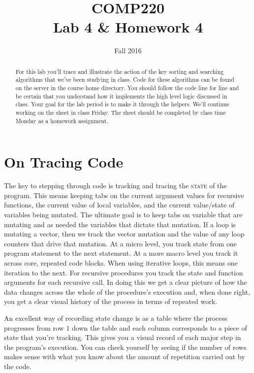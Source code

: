 \documentclass[10pt]{article}
\title{COMP220 \\ Lab 4 \& Homework 4}
\author{ }
\date{Fall 2016}
\begin{document}
\maketitle
\thispagestyle{empty}
\begin{abstract}
For this lab you'll trace and illustrate the action of the key sorting and searching algorithms that we've been studying in class. Code for these algorithms can be found on the server in the course home directory. You should follow the code line for line and be certain that you understand how it implements the high level logic discussed in class. Your goal for the lab period is to make it through the helpers. We'll continue working on the sheet in class Friday. The sheet should be completed by class time Monday as a homework assignment.
\end{abstract}

\section*{On Tracing Code}

The key to stepping through code is tracking and tracing the \textsc{state} of the program. This means keeping tabs on the current argument values for recursive functions, the current value of local variables, and the current value/state of variables being mutated. The ultimate goal is to keep tabs on variable that are mutating and as needed the variables that dictate that mutation. If a loop is mutating a vector, then we track the vector mutation and the value of any loop counters that drive that mutation. At a micro level, you track state from one program statement to the next statement. At a more macro level you track it across core, repeated code blocks.  When using iterative loops, this means one iteration to the next. For recursive procedures you track the state and function arguments for each recursive call. In doing this we get a clear picture of how the data changes across the whole of the procedure's execution and, when done right, you get a clear visual history of the process in terms of repeated work.

An excellent way of recording state change is as a table where the process progresses from row $1$ down the table and each column corresponds to a piece of state that you're tracking. This gives you a visual record of each major step in the program's execution. You can check yourself by seeing if the number of rows makes sense with what you know about the amount of repetition carried out by the code.
\end{document}
